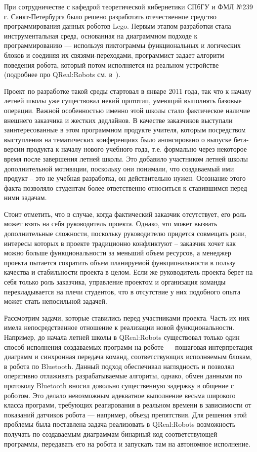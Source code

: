 \documentclass[a5paper]{article}
\begin{document}
При сотрудничестве с кафедрой теоретической кибернетики СПбГУ и ФМЛ №239 г. Санкт-Петербурга было решено разработать отечественное средство программирования данных роботов Lego. Первым этапом разработки стала инструментальная среда, основанная на диаграммном подходе к программированию --- используя пиктограммы функциональных и логических блоков и соединяя их связями-переходами, программист задает алгоритм поведения робота, который потом исполняется на реальном устройстве (подробнее про QReal:Robots см. в~\cite{robots}).

Проект по разработке такой среды стартовал в январе 2011 года, так что к началу летней школы уже существовал некий прототип, умеющий выполнять базовые операции. Важной особенностью именно этой школы стало фактическое наличие внешнего заказчика и жестких дедлайнов. В качестве заказчиков выступали заинтересованные в этом программном продукте учителя, которым посредством выступления на тематических конференциях было анонсировано о выпуске бета-версии продукта к началу нового учебного года, т.е. формально через некоторое время после завершения летней школы. Это добавило участником летней школы дополнительной мотивации, поскольку они понимали, что создаваемый ими продукт -- это не учебная разработка, он действительно нужен. Осознание этого факта позволяло студентам более ответственно относиться к ставившимся перед ними задачам. 

Стоит отметить, что в случае, когда фактический заказчик отсутствует, его роль может взять на себя руководитель проекта. Однако, это может вызвать дополнительные сложности, поскольку руководителю придется совмещать роли, интересы которых в проекте традиционно конфликтуют -- заказчик хочет как можно больше функциональности за меньший объем ресурсов, а менеджер проекта пытается сократить объем планируемой функциональности в пользу качества и стабильности проекта в целом. Если же руководитель проекта берет на себя только роль заказчика, управление проектом и организация команды перекладывается на плечи студентов, что в отсутствие у них подобного опыта может стать непосильной задачей.

Рассмотрим задачи, которые ставились перед участниками проекта. Часть их них имела непосредственное отношение к реализации новой функциональности. Например, до начала летней школы в QReal:Robots существовал только один способ исполнения создаваемых программ на роботе --- пошаговая интерпретация диаграмм и синхронная передача команд, соответствующих исполняемым блокам, в робота по Bluetooth. Данный подход обеспечивал наглядность и позволял оперативно отлаживать разрабатываемые алгориты, однако, обмен данными по протоколу Bluetooth вносил довольно существенную задержку в общение с роботом. Это делало невозможным адекватное выполнение весьма широкого класса программ, требующих реагирования в реальном времени в зависимости от показаний датчиков робота --- например, объезд препятствия. Для решения этой проблемы была поставлена задача реализовать в QReal:Robots возможность получать по создаваемым диаграммам бинарный код соответствующей программы, передавать его на робота и запускать там на автономное исполнение.
\end{document}
